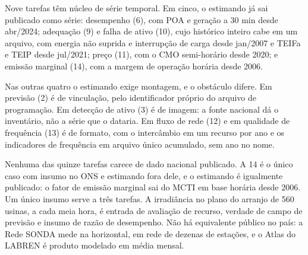 \documentclass[10pt,a4paper,oneside]{book}
\begin{document}
\begin{landscape}

\par\vspace{1.1em}

\begin{promancha}
Nove tarefas têm núcleo de série temporal. Em cinco, o estimando já sai publicado
como série: desempenho (6), com POA e geração a 30 min desde abr/2024; adequação
(9) e falha de ativo (10), cujo histórico inteiro cabe em um arquivo, com energia
não suprida e interrupção de carga desde jan/2007 e TEIFa e TEIP desde jul/2021;
preço (11), com o CMO semi-horário desde 2020; e emissão marginal (14), com a
margem de operação horária desde 2006.

Nas outras quatro o estimando exige montagem, e o obstáculo difere. Em previsão
(2) é de vinculação, pelo identificador próprio do arquivo de programação. Em
detecção de ativo (3) é de imagem: a fonte nacional dá o inventário, não a série
que o dataria. Em fluxo de rede (12) e em qualidade de frequência (13) é de
formato, com o intercâmbio em um recurso por ano e os indicadores de frequência
em arquivo único acumulado, sem ano no nome.

Nenhuma das quinze tarefas carece de dado nacional publicado. A 14 é o único caso
com insumo no ONS e estimando fora dele, e o estimando é igualmente publicado: o
fator de emissão marginal sai do MCTI em base horária desde 2006.
Um único insumo serve a três tarefas. A irradiância no plano do arranjo
de 560 usinas, a cada meia hora, é entrada de avaliação de recurso, verdade de
campo de previsão e insumo de razão de desempenho. Não há equivalente público no
país: a Rede SONDA mede na horizontal, em rede de dezenas de estações, e o Atlas
do LABREN é produto modelado em média mensal.
\end{promancha}


\end{landscape}
\end{document}
